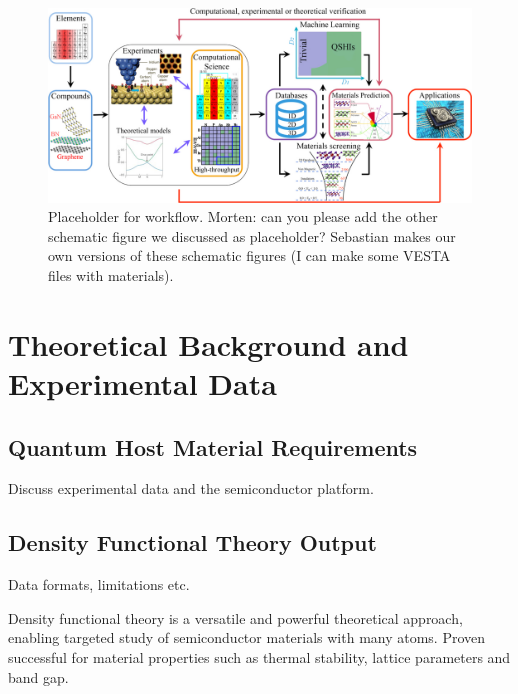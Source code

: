\documentclass[superscriptaddress,unsortedaddress,
 amsmath,amssymb,
 aps,
]{revtex4-2}
\begin{document}
\begin{figure}
    \centering
    \includegraphics[width=\textwidth]{figures/ht-workflow.jpg}
    \caption{Placeholder for workflow. Morten: can you please add the other schematic figure we discussed as placeholder? Sebastian makes our own versions of these schematic figures (I can make some VESTA files with materials). }
    \label{fig:ht-workflow}
\end{figure}

\section*{Theoretical Background and Experimental Data} 


\subsection*{Quantum Host Material Requirements} %
Discuss experimental data and the semiconductor platform. 


\subsection*{Density Functional Theory Output} %
Data formats, limitations etc.  

Density functional theory is a versatile and powerful theoretical approach, enabling targeted study of semiconductor materials with many atoms. 
Proven successful for material properties such as thermal stability, lattice parameters and band gap. 
\end{document}
